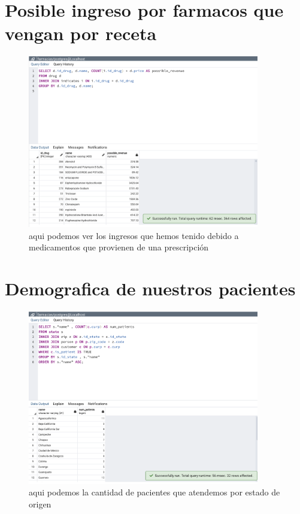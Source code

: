 \documentclass[12pt, fleqn]{report}                             %
\theoremstyle{break}                                            %
\begin{document}
        \clearpage
        \section{Posible ingreso por farmacos que vengan por receta}
            
            \begin{figure}[ht]
                \includegraphics[width=0.9\textwidth]{12}
                \caption{aqui podemos ver los ingresos que hemos tenido debido a medicamentos que provienen 
                de una prescripción
                }
            \end{figure}
    
        \clearpage
        \section{Demografica de nuestros pacientes}
            
            \begin{figure}[ht]
                \includegraphics[width=0.9\textwidth]{13}
                \caption{aqui podemos la cantidad de pacientes que atendemos por estado de origen
                }
            \end{figure}
\end{document}

